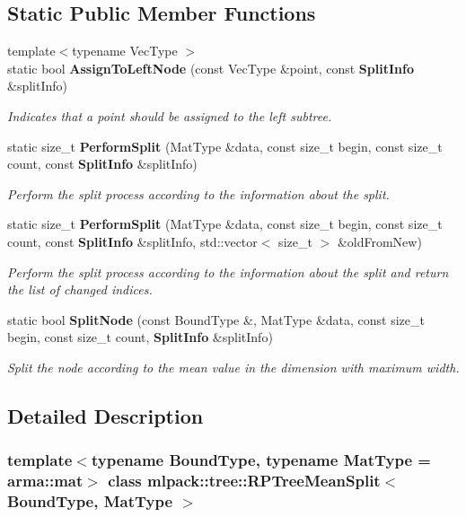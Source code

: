 \subsection*{Static Public Member Functions}
\begin{DoxyCompactItemize}
\item 
{\footnotesize template$<$typename Vec\+Type $>$ }\\static bool \textbf{ Assign\+To\+Left\+Node} (const Vec\+Type \&point, const \textbf{ Split\+Info} \&split\+Info)
\begin{DoxyCompactList}\small\item\em Indicates that a point should be assigned to the left subtree. \end{DoxyCompactList}\item 
static size\+\_\+t \textbf{ Perform\+Split} (Mat\+Type \&data, const size\+\_\+t begin, const size\+\_\+t count, const \textbf{ Split\+Info} \&split\+Info)
\begin{DoxyCompactList}\small\item\em Perform the split process according to the information about the split. \end{DoxyCompactList}\item 
static size\+\_\+t \textbf{ Perform\+Split} (Mat\+Type \&data, const size\+\_\+t begin, const size\+\_\+t count, const \textbf{ Split\+Info} \&split\+Info, std\+::vector$<$ size\+\_\+t $>$ \&old\+From\+New)
\begin{DoxyCompactList}\small\item\em Perform the split process according to the information about the split and return the list of changed indices. \end{DoxyCompactList}\item 
static bool \textbf{ Split\+Node} (const Bound\+Type \&, Mat\+Type \&data, const size\+\_\+t begin, const size\+\_\+t count, \textbf{ Split\+Info} \&split\+Info)
\begin{DoxyCompactList}\small\item\em Split the node according to the mean value in the dimension with maximum width. \end{DoxyCompactList}\end{DoxyCompactItemize}


\subsection{Detailed Description}
\subsubsection*{template$<$typename Bound\+Type, typename Mat\+Type = arma\+::mat$>$\newline
class mlpack\+::tree\+::\+R\+P\+Tree\+Mean\+Split$<$ Bound\+Type, Mat\+Type $>$}


